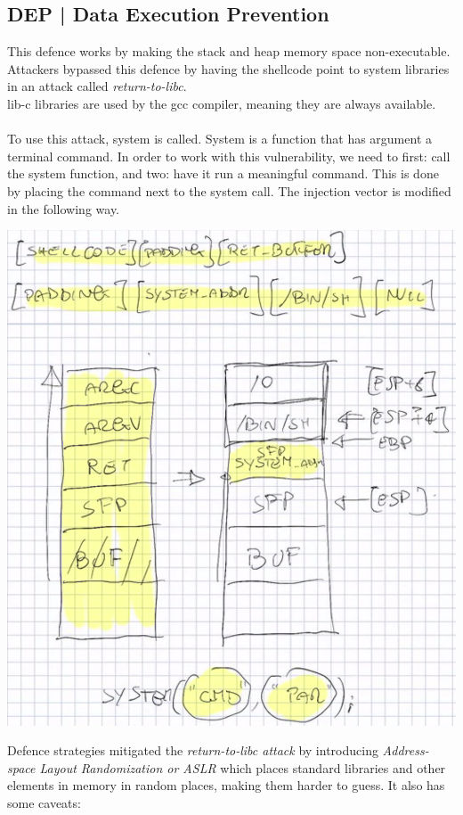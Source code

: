 \documentclass[11pt, oneside]{article}   	%
\begin{document}
\subsection*{DEP | Data Execution Prevention}
This defence works by making the stack and heap memory space non-executable. Attackers bypassed this defence by having the shellcode point to system libraries in an attack called \emph{return-to-libc}.\\ lib-c libraries are used by the gcc compiler, meaning they are always available.\\\\
To use this attack, system is called. System is a function that has argument a terminal command. In order to work with this vulnerability, we need to first: call the system function, and two: have it run a meaningful command. This is done by placing the command next to the system call. The injection vector is modified in the following way.
\begin{center}
\includegraphics[scale = 0.5]{libc}
\end{center}
Defence strategies mitigated the \emph{return-to-libc attack} by introducing \emph{Address-space Layout Randomization or ASLR} which places standard libraries and other elements in memory in random places, making them harder to guess. It also has some caveats:
\end{document}
